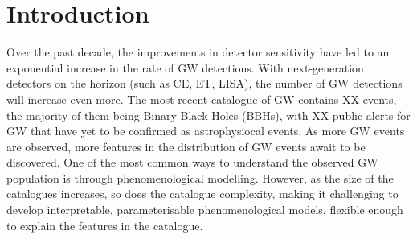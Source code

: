 \documentclass[twocolumn]{aastex631}
\begin{document}
\title{}


\author{Avi Vajpeyi}

\author{Jeff Riley}
\author{Ilya Mandel}
\author{Chayan Chatterjee}
\affiliation{}




\begin{abstract}
    We're using GPs to build surrogate likelihoods for COMPAS star formation parameters, given the LVK observed dataset.
\end{abstract}




\section{Introduction}
\label{sec:intro}
Over the past decade, the improvements in detector sensitivity have led to an exponential increase in the rate of GW detections.
With next-generation detectors on the horizon (such as CE, ET, LISA), the number of GW detections will increase even more.
The most recent catalogue of GW contains
XX events, the majority of them being Binary Black Holes
(BBHs), with XX public alerts for GW that have yet to be confirmed as astrophysiocal events.
As more GW events are observed, more features
in the distribution of GW events await to be discovered.
One of the most common ways to understand the observed GW population is through phenomenological modelling.
However, as the size of the catalogues increases, so does the catalogue complexity, making it challenging to develop interpretable, parameterisable phenomenological models, flexible enough to explain the features in the catalogue.
\end{document}
